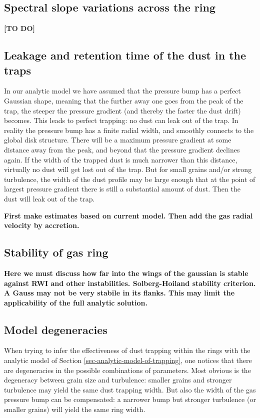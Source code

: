 \documentclass{aa}
\begin{document}
\subsection{Spectral slope variations across the ring}
\label{sec-anmodel-slope-variations}
%

{\bf [TO DO]}

\subsection{Leakage and retention time of the dust in the traps}
\label{sec-leakage}
%
In our analytic model we have assumed that the pressure bump has a perfect
Gaussian shape, meaning that the further away one goes from the peak of the
trap, the steeper the pressure gradient (and thereby the faster the dust drift)
becomes. This leads to perfect trapping: no dust can leak out of the trap.
In reality the pressure bump has a finite radial width, and smoothly
connects to the global disk structure. There will be a maximum pressure
gradient at some distance away from the peak, and beyond that the pressure
gradient declines again. If the width of the trapped dust is much narrower
than this distance, virtually no dust will get lost out of the trap. But
for small grains and/or strong turbulence, the width of the dust profile may
be large enough that at the point of largest pressure gradient there is
still a substantial amount of dust. Then the dust will leak out of the
trap. 

{\bf First make estimates based on current model. Then add the gas radial
velocity by accretion.}


\subsection{Stability of gas ring}
\label{sec-gas-ring-stability}

{\bf Here we must discuss how far into the wings of the gaussian is
  stable against RWI and other instabilities. Solberg-Hoiland stability
  criterion. A Gauss may not be very stabile in its flanks. This may limit
the applicability of the full analytic solution.}


\subsection{Model degeneracies}
\label{sec-anmodel-degeneracies}
%
When trying to infer the effectiveness of dust trapping within the rings with
the analytic model of Section \ref{sec-analytic-model-of-trapping}, one notices
that there are degeneracies in the possible combinations of parameters. Most
obvious is the degeneracy between grain size and turbulence: smaller grains
and stronger turbulence may yield the same dust trapping width. But also the
width of the gas pressure bump can be compensated: a narrower bump but stronger
turbulence (or smaller grains) will yield the same ring width.
\end{document}
